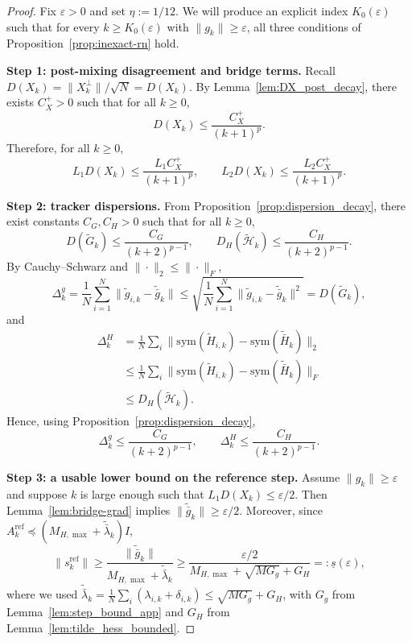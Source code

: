 \documentclass[11pt,a4paper]{article}
\begin{document}
\begin{proof}
Fix $\varepsilon>0$ and set $\eta:=1/12$.
We will produce an explicit index $K_0(\varepsilon)$ such that for every $k\ge K_0(\varepsilon)$ with $\|g_k\|\ge \varepsilon$,
all three conditions of Proposition~\ref{prop:inexact-rn} hold.

\smallskip
\noindent\textbf{Step 1: post-mixing disagreement and bridge terms.}
Recall $D(X_k)=\|X_k^\perp\|/\sqrt N = D(X_k)$.
By Lemma~\ref{lem:DX_post_decay}, there exists $C_X^{+}>0$ such that for all $k\ge 0$,
\begin{equation}\label{eq:DX_post_decay_app}
D(X_k)\le \frac{C_X^{+}}{(k+1)^p}.
\end{equation}
Therefore, for all $k\ge 0$,
\begin{equation}\label{eq:bridge_targets_app}
L_1D(X_k)\le \frac{L_1C_X^{+}}{(k+1)^p},
\qquad
L_2D(X_k)\le \frac{L_2C_X^{+}}{(k+1)^p}.
\end{equation}

\smallskip
\noindent\textbf{Step 2: tracker dispersions.}
From Proposition~\ref{prop:dispersion_decay}, there exist constants $C_G,C_H>0$ such that for all $k\ge 0$,
\begin{equation}\label{eq:GH_decay_app}
D(\tilde G_k)\le \frac{C_G}{(k+2)^{p-1}},
\qquad
D_H(\tilde{\mathcal H}_k)\le \frac{C_H}{(k+2)^{p-1}}.
\end{equation}
By Cauchy--Schwarz and $\|\cdot\|_2\le \|\cdot\|_F$,
\[
\Delta_k^g
=\frac1N\sum_{i=1}^N\|\tilde g_{i,k}-\tilde{\bar g}_k\|
\le \sqrt{\frac1N\sum_{i=1}^N\|\tilde g_{i,k}-\tilde{\bar g}_k\|^2}
= D(\tilde G_k),
\]
and
\begin{align*}
\Delta_k^H
&=\tfrac1N\textstyle\sum_{i}\big\|\mathrm{sym}(\tilde H_{i,k})\!-\!\mathrm{sym}(\tilde{\bar H}_k)\big\|_2\\
&\le \tfrac1N\textstyle\sum_{i}\big\|\mathrm{sym}(\tilde H_{i,k})\!-\!\mathrm{sym}(\tilde{\bar H}_k)\big\|_F\\
&\le D_H(\tilde{\mathcal H}_k).
\end{align*}
Hence, using Proposition~\ref{prop:dispersion_decay},
\begin{equation}\label{eq:Delta_decay_app}
\Delta_k^g\le \frac{C_G}{(k+2)^{p-1}},
\qquad
\Delta_k^H\le \frac{C_H}{(k+2)^{p-1}}.
\end{equation}

\smallskip
\noindent\textbf{Step 3: a usable lower bound on the reference step.}
Assume $\|g_k\|\ge \varepsilon$ and suppose $k$ is large enough such that $L_1D(X_k)\le \varepsilon/2$.
Then Lemma~\ref{lem:bridge-grad} implies
$\|\tilde{\bar g}_k\|\ge \varepsilon/2$.
Moreover, since $A_k^{\mathrm{ref}}\preceq (M_{H,\max}+\tilde{\bar\lambda}_k)I$,
\[
\|s_k^{\mathrm{ref}}\|
\ge \frac{\|\tilde{\bar g}_k\|}{M_{H,\max}+\tilde{\bar\lambda}_k}
\ge \frac{\varepsilon/2}{M_{H,\max}+\sqrt{MG_g}+G_H}
=:\underline s(\varepsilon),
\]
where we used $\tilde{\bar\lambda}_k=\frac{1}{N}\sum_i(\lambda_{i,k}+\delta_{i,k})\le \sqrt{MG_g}+G_H$, with $G_g$ from Lemma~\ref{lem:step_bound_app} and $G_H$ from Lemma~\ref{lem:tilde_hess_bounded}.


\end{proof}
\end{document}
